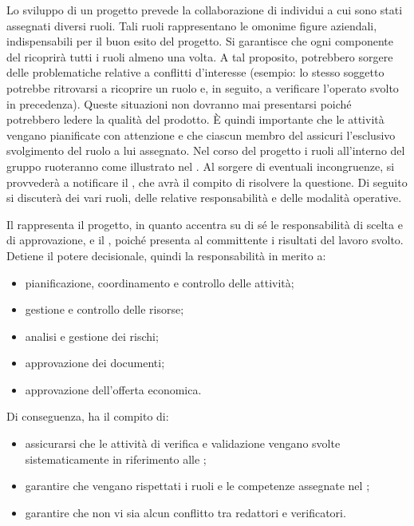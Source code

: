 \documentclass[a4paper, titlepage]{article}
\begin{document}
Lo sviluppo di un progetto prevede la collaborazione di individui a cui sono stati assegnati diversi ruoli. Tali ruoli rappresentano le omonime figure aziendali, indispensabili per il buon esito del progetto. Si garantisce che ogni componente del  ricoprirà tutti i ruoli almeno una volta. A tal proposito, potrebbero sorgere delle problematiche relative a conflitti d’interesse (esempio: lo stesso soggetto potrebbe ritrovarsi a ricoprire un ruolo e, in seguito, a verificare l’operato svolto in precedenza). Queste situazioni non dovranno mai presentarsi poiché potrebbero ledere la qualità del prodotto. È quindi importante che le attività vengano pianificate con attenzione e che ciascun membro del  assicuri l’esclusivo svolgimento del ruolo a lui assegnato. Nel corso del progetto i ruoli all'interno del gruppo ruoteranno come illustrato nel . Al sorgere di eventuali incongruenze, si provvederà a notificare il , che avrà il compito di risolvere la questione.
Di seguito si discuterà dei vari ruoli, delle relative responsabilità e delle modalità operative.

Il  rappresenta il progetto, in quanto accentra su di sé le responsabilità di scelta e di approvazione, e il , poiché presenta al committente i risultati del
lavoro svolto.
Detiene il potere decisionale, quindi la responsabilità in merito a:
\begin{itemize}
	\item pianificazione, coordinamento e controllo delle attività;
	\item gestione e controllo delle risorse;
	\item analisi e gestione dei rischi;
	\item approvazione dei documenti;
	\item approvazione dell'offerta economica.
\end{itemize}
Di conseguenza, ha il compito di:
\begin{itemize}
	\item assicurarsi che le attività di verifica e validazione vengano svolte sistematicamente in riferimento alle ;
	\item garantire che vengano rispettati i ruoli e le competenze assegnate nel ;
	\item garantire che non vi sia alcun conflitto tra redattori e verificatori.
\end{itemize}
\end{document}
